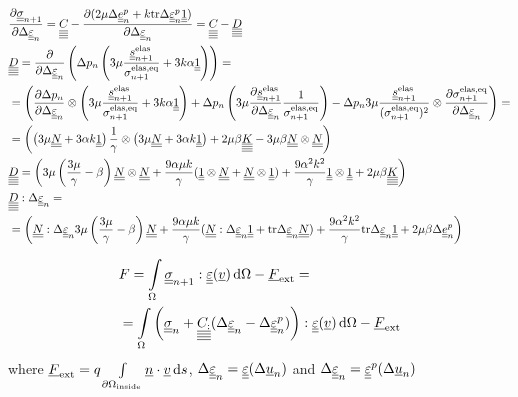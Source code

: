 \documentclass[12pt]{article}
\begin{document}
\begin{appendices}
    \begin{align}
        & \frac{\partial\uusigman}{\partial \Deltaeps} = \uuuuC{} - \frac{\partial (2\mu\Deltaep + k\mtr\Deltaepsp\uuUnit)}{\partial\Deltaeps} = \uuuuC{} - \uuuuD \\
        & \uuuuD =  \frac{\partial }{\partial \Deltaeps} \left( \Delta p_n \left( 3\mu \frac{\uusnelas}{\sigmaeqnelas} + 3k\alpha \uuUnit  \right) \right) = \\
        & = \left( \frac{\partial\Delta p_n}{\partial\Deltaeps} \otimes \left( 3\mu\frac{\uusnelas}{\sigmaeqnelas} + 3k\alpha \uuUnit \right) + \Delta p_n \left(3\mu\frac{\partial\uusnelas}{\partial\Deltaeps}\frac{1}{\sigmaeqnelas} \right) - \Delta p_n 3\mu\frac{\uusnelas}{(\sigmaeqnelas)^2} \otimes \frac{\partial\sigmaeqnelas}{\partial\Deltaeps}\right) = \\
        & = \left( \left( 3\mu \uuN + 3\alpha k \uuUnit \right) \frac{1}{\gamma} \otimes \left( 3\mu \uuN + 3\alpha k \uuUnit \right) + 2\mu\beta\uuuuK - 3\mu\beta\uuN \otimes \uuN \right) \\
        & \uuuuD = \left( 3\mu\left(\frac{3\mu}{\gamma} - \beta\right)\uuN \otimes \uuN + \frac{9\alpha\mu k}{\gamma} (\uuUnit \otimes \uuN + \uuN \otimes \uuUnit) + \frac{9\alpha^2k^2}{\gamma} \uuUnit \otimes \uuUnit + 2\mu\beta \uuuuK \right) \\
        & \uuuuD : \Deltaeps = \\
        & = \left( \uuN : \Deltaeps 3\mu \left( \frac{3\mu}{\gamma} - \beta \right) \uuN + \frac{9\alpha\mu k}{\gamma} (\uuN : \Deltaeps \uuUnit + \mtr\Deltaeps \uuN) + \frac{9\alpha^2k^2}{\gamma} \mtr \Deltaeps \uuUnit + 2\mu\beta \Deltaep \right)  \\
    \end{align}

    \begin{align}
        & F = \int\limits_\Omega \uusigman : \uueps(\uv) \, \md\Omega - \uF_\text{ext} = \\ 
        & = \int\limits_\Omega \left( \uusigma_n + \uuuuC : (\Deltaeps - \Deltaeps^p) \right) : \uueps(\uv) \, \md\Omega - \uF_\text{ext} 
    \end{align}
    where $\uF_\text{ext} = q \int\limits_{\partial\Omega_\text{inside}}\un \cdot \uv \, \md s $, $\Deltaeps = \uueps(\Delta\uu_n)$ and $\Deltaeps = \uueps^p(\Delta\uu_n)$


\end{appendices}
\end{document}
